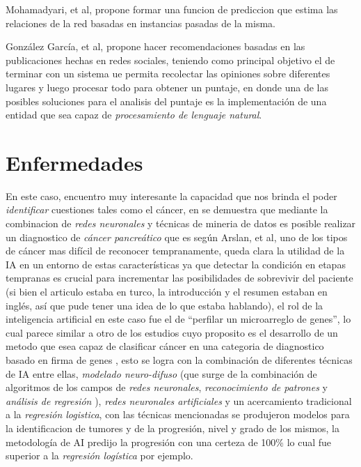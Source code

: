 \documentclass{article}
\begin{document}
Mohamadyari, et al, propone formar una funcion de prediccion que estima las relaciones de la red basadas en instancias pasadas de la misma.

Gonz\'alez Garc\'ia, et al, propone hacer recomendaciones basadas en las publicaciones hechas en redes sociales, teniendo como principal objetivo el de terminar con un sistema ue permita recolectar las opiniones sobre diferentes lugares y luego procesar todo para obtener un puntaje, en donde una de las posibles soluciones para el analisis del puntaje es la implementaci\'on de una entidad que sea capaz de \textit{procesamiento de lenguaje natural}.



\section{Enfermedades}
\label{sec:enfermedades}
En este caso, encuentro muy interesante la capacidad que nos brinda el poder \textit{identificar} cuestiones tales como el c\'ancer, en \cite{arslan2017} se demuestra que mediante la combinacion de \textit{redes neuronales} y t\'ecnicas de mineria de datos es posible realizar un diagnostico de \textit{c\'ancer pancre\'atico} que es seg\'un Arslan, et al, uno de los tipos de c\'ancer mas dif\'icil de reconocer tempranamente, queda clara la utilidad de la IA en un entorno de estas caracter\'isticas ya que detectar la condici\'on en etapas tempranas es crucial para incrementar las posibilidades de sobrevivir del paciente (si bien el articulo estaba en turco, la introducci\'on y el resumen estaban en ingl\'es, as\'i que pude tener una idea de lo que estaba hablando), el rol de la inteligencia artificial en este caso fue el de ``perfilar un microarreglo de genes'', lo cual parece similar a otro de los estudios cuyo proposito es el desarrollo de un metodo que esea capaz de clasificar c\'ancer en una categoria de diagnostico basado en firma de genes \cite{abbod2006}, esto se logra con la combinaci\'on de diferentes t\'ecnicas de IA entre ellas, \textit{modelado neuro-difuso} (que surge de la combinaci\'on de algoritmos de los campos de \textit{redes neuronales}, \textit{reconocimiento de patrones} y \textit{an\'alisis de regresi\'on} \cite{babuska2002}), \textit{redes neuronales artificiales} y un acercamiento tradicional a la \textit{regresi\'on logistica}, con  las t\'ecnicas mencionadas se produjeron modelos para la identificacion de tumores y de la progresi\'on, nivel y grado  de los mismos, la metodolog\'ia de  AI predijo la progresi\'on con una certeza de 100\% lo cual fue superior a la \textit{regresi\'on log\'istica} por ejemplo.\\
\end{document}
